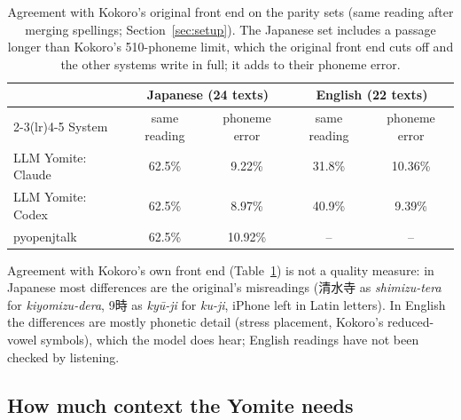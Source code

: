 \documentclass[11pt,a4paper]{article}
\begin{document}
\begin{table}[t]
\centering\small
\caption{Agreement with Kokoro's original front end on the parity sets (same reading after merging spellings;
Section~\ref{sec:setup}). The Japanese set includes a passage longer than Kokoro's 510-phoneme limit, which the
original front end cuts off and the other systems write in full; it adds to their phoneme error.}
\label{tab:paritysets}
\begin{tabular}{lcccc}
\toprule
& \multicolumn{2}{c}{Japanese (24 texts)} & \multicolumn{2}{c}{English (22 texts)}\\
\cmidrule(lr){2-3}\cmidrule(lr){4-5}
System & same reading & phoneme error & same reading & phoneme error\\
\midrule
LLM Yomite: Claude & 62.5\% & 9.22\% & 31.8\% & 10.36\%\\
LLM Yomite: Codex & 62.5\% & 8.97\% & 40.9\% & 9.39\%\\
pyopenjtalk & 62.5\% & 10.92\% & -- & --\\
\bottomrule
\end{tabular}
\end{table}

Agreement with Kokoro's own front end (Table~\ref{tab:paritysets}) is not a quality measure: in Japanese most
differences are the original's misreadings (清水寺 as \emph{shimizu-tera} for \emph{kiyomizu-dera}, 9時 as
\emph{kyū-ji} for \emph{ku-ji}, iPhone left in Latin letters). In English the differences are mostly phonetic detail
(stress placement, Kokoro's reduced-vowel symbols), which the model does hear; English readings have not been checked
by listening.

\subsection{How much context the Yomite needs}\label{sec:author}
\end{document}
